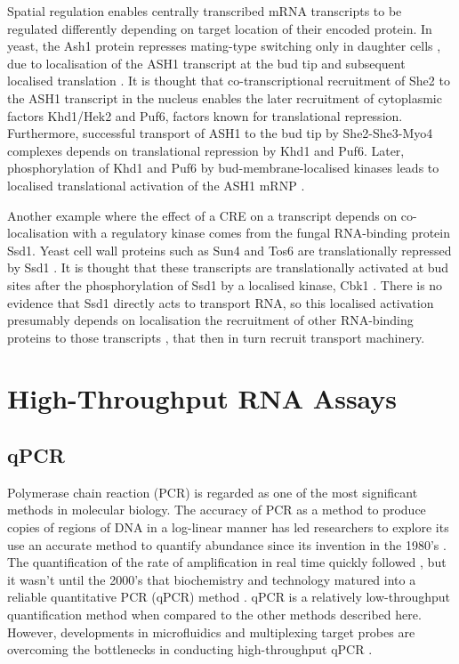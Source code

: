 \documentclass[../main.tex]{subfiles}
\begin{document}
Spatial regulation enables centrally transcribed mRNA transcripts to be regulated differently depending on target location of their encoded protein.
In yeast, the Ash1 protein represses mating-type switching only in daughter
cells \parencite{Sil1996}, due to localisation of the ASH1 transcript at the bud tip and subsequent localised translation \parencite{Niednery2014}. 
It is thought that co-transcriptional recruitment of She2 to the ASH1 transcript in the nucleus enables the later recruitment of cytoplasmic factors Khd1/Hek2 and Puf6, factors known for translational repression. 
Furthermore, successful transport of ASH1 to the bud tip by She2-She3-Myo4 complexes depends on translational repression by Khd1 and Puf6. 
Later, phosphorylation of Khd1 and Puf6 by bud-membrane-localised kinases leads to localised translational activation of the ASH1 mRNP \parencite{Paquin2007, Deng2008}.

Another example where the effect of a CRE on a transcript depends on co-localisation with a regulatory kinase comes from the fungal RNA-binding protein Ssd1. 
Yeast cell wall proteins such as Sun4 and Tos6 are translationally repressed by Ssd1 \parencite{Jansen2009}.
It is thought that these transcripts are translationally activated at bud sites after the phosphorylation of Ssd1 by a localised kinase, Cbk1 \parencite{Jansen2009}. 
There is no evidence that Ssd1 directly acts to transport RNA, so this localised activation presumably depends on localisation the recruitment of other RNA-binding proteins to those transcripts \parencite{Hogan2008, Bayne2021}, that then in turn recruit transport machinery.
\newpage


\section{High-Throughput RNA Assays}

\subsection{qPCR}

Polymerase chain reaction (PCR) is regarded as one of the most significant methods in molecular biology.
The accuracy of PCR as a method to produce copies of regions of DNA in a log-linear manner has led researchers to explore its use an accurate method to quantify abundance since its invention in the 1980's \parencite{Saiki1988}.
The quantification of the rate of amplification in real time quickly followed \parencite{Holland1991}, but it wasn't until the 2000's that biochemistry and technology matured into a reliable quantitative PCR (qPCR) method \parencite{Walker2002}.
qPCR is a relatively low-throughput quantification method when compared to the other methods described here.
However, developments in microfluidics and multiplexing target probes are overcoming the bottlenecks in conducting high-throughput qPCR \parencite{Dreier2022}.
\end{document}
